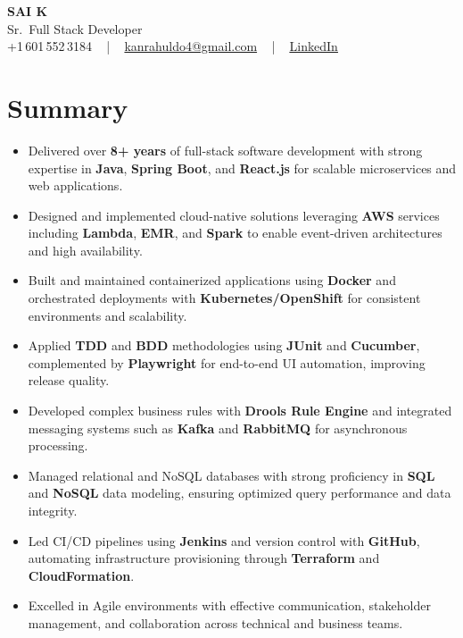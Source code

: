 \documentclass[letterpaper,11pt]{article}
\newcommand{\resumeItem}[1]{
  \item\footnotesize{
    {#1 \vspace{-2pt}}
  }
}
\newcommand{\resumeItemListStart}{\begin{itemize}[leftmargin=*]}
\newcommand{\resumeItemListEnd}{\end{itemize}\vspace{-5pt}}
\begin{document}
\begin{center}
    {\fontsize{14pt}{12pt}\selectfont \textbf{\MakeUppercase{Sai K}}}\\ \vspace{2pt}
    \fontsize{10pt}{12pt}\selectfont Sr.\ Full Stack Developer\\ \vspace{2pt}
    \fontsize{10pt}{12pt}\selectfont +1\,601\,552\,3184 ~ | ~
    \href{mailto:kanrahuldo4@gmail.com}{kanrahuldo4@gmail.com} ~ | ~
    \href{https://www.linkedin.com/in/srrrk/}{\color{blue}\underline{LinkedIn}}
    \vspace{-10pt}
\end{center}

\section{Summary}
\fontsize{9pt}{10pt}\selectfont
\resumeItemListStart
  \resumeItem{Delivered over \textbf{8+ years} of full-stack software development with strong expertise in \textbf{Java}, \textbf{Spring Boot}, and \textbf{React.js} for scalable microservices and web applications.}
  \resumeItem{Designed and implemented cloud-native solutions leveraging \textbf{AWS} services including \textbf{Lambda}, \textbf{EMR}, and \textbf{Spark} to enable event-driven architectures and high availability.}
  \resumeItem{Built and maintained containerized applications using \textbf{Docker} and orchestrated deployments with \textbf{Kubernetes/OpenShift} for consistent environments and scalability.}
  \resumeItem{Applied \textbf{TDD} and \textbf{BDD} methodologies using \textbf{JUnit} and \textbf{Cucumber}, complemented by \textbf{Playwright} for end-to-end UI automation, improving release quality.}
  \resumeItem{Developed complex business rules with \textbf{Drools Rule Engine} and integrated messaging systems such as \textbf{Kafka} and \textbf{RabbitMQ} for asynchronous processing.}
  \resumeItem{Managed relational and NoSQL databases with strong proficiency in \textbf{SQL} and \textbf{NoSQL} data modeling, ensuring optimized query performance and data integrity.}
  \resumeItem{Led CI/CD pipelines using \textbf{Jenkins} and version control with \textbf{GitHub}, automating infrastructure provisioning through \textbf{Terraform} and \textbf{CloudFormation}.}
  \resumeItem{Excelled in Agile environments with effective communication, stakeholder management, and collaboration across technical and business teams.}
\resumeItemListEnd
\vspace{-6pt}
\end{document}
